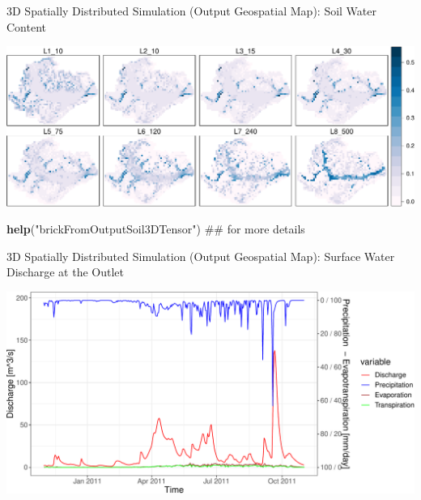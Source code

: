 \documentclass[ignorenonframetext,]{beamer}
\newenvironment{Shaded}{\begin{snugshade}}{\end{snugshade}}
\newcommand{\KeywordTok}[1]{\textcolor[rgb]{0.13,0.29,0.53}{\textbf{#1}}}
\newcommand{\StringTok}[1]{\textcolor[rgb]{0.31,0.60,0.02}{#1}}
\newcommand{\NormalTok}[1]{#1}
\begin{document}
\begin{frame}[fragile]{3D Spatially Distributed Simulation (Output
Geospatial Map): Soil Water Content}

\includegraphics{presentation_files/figure-beamer/unnamed-chunk-15-1.pdf}

\begin{Shaded}
\begin{Highlighting}[]
\KeywordTok{help}\NormalTok{(}\StringTok{"brickFromOutputSoil3DTensor"}\NormalTok{) ## for more details}
\end{Highlighting}
\end{Shaded}

\end{frame}

\begin{frame}{3D Spatially Distributed Simulation (Output Geospatial
Map): Surface Water Discharge at the Outlet}

\includegraphics{presentation_files/figure-beamer/unnamed-chunk-18-1.pdf}

\end{frame}
\end{document}
